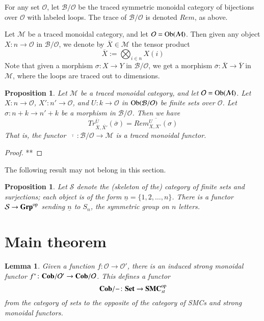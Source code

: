 \documentclass{amsart}
\def\tn{\textnormal}
\def\mc{\mathcal}
\def\Ob{\tn{Ob}}
\def\to{\rightarrow}
\def\taking{\colon}
\def\op{^\tn{op}}
\def\ol{\overline}
\def\ul{\underline}
\def\Cob{{\bf Cob}}
\def\Set{{\bf Set}}
\def\Grp{{\bf Grp}}
\def\mcB{\mc{B}}
\def\mcM{\mc{M}}
\def\mcO{\mc{O}}
\def\mcS{\mc{S}}
\def\SMC{{\bf SMC}}
\newtheorem{lemma}[subsubsection]{Lemma}
\newtheorem{proposition}[subsubsection]{Proposition}
\theoremstyle{remark}
\theoremstyle{definition}
\begin{document}
For any set $\mcO$, let $\mcB/\mcO$ be the traced symmetric monoidal category of bijections over $\mcO$ with labeled loops.  The trace of $\mcB/\mcO$ is denoted $Rem$, as above.

Let $\mcM$ be a traced monoidal category, and let $\mcO=\Ob(\mcM)$. Then given any object $X\taking n\to\mcO$ in $\mcB/\mcO$, we denote by $\ol{X}\in\mcM$ the tensor product 
$$\ol{X}:=\bigotimes_{i\in n}X(i)$$
Note that given a morphism $\sigma\taking X\to Y$ in $\mcB/\mcO$, we get a morphism $\ol{\sigma}\taking\ol{X}\to\ol{Y}$ in $\mcM$, where the loops are traced out to dimensions.

\begin{proposition}

Let $\mcM$ be a traced monoidal category, and let $\mcO=\Ob(\mcM)$. Let $X\taking n\to\mcO$, $X'\taking n'\to\mcO$, and $U\taking k\to\mcO$ in $\Ob(\mcB/\mcO)$ be finite sets over $\mcO$. Let $\sigma\taking n+k\to n'+k$ be a morphism in $\mcB/\mcO$. Then we have 
$$Tr^{\ol{U}}_{\ol{X},\ol{X'}}(\ol{\sigma})=\ol{Rem^U_{X,X'}(\sigma)}$$
That is, the functor $\ol{\;\cdot\;}\taking\mcB/\mcO\to\mcM$ is a traced monoidal functor.

\end{proposition}

\begin{proof}

**

\end{proof}

The following result may not belong in this section.

\begin{proposition}

Let $\mcS$ denote the (skeleton of the) category of finite sets and surjections; each object is of the form $\ul{n}=\{1,2,\ldots,n\}$. There is a functor $\mcS\to\Grp\op$ sending $\ul{n}$ to $S_n$, the symmetric group on $n$ letters.

\end{proposition}

\section{Main theorem}

\begin{lemma}

Given a function $f\taking\mcO\to\mcO'$, there is an induced strong monoidal functor $f^*\taking\Cob/\mcO'\to\Cob/\mcO$. This defines a functor 
$$\Cob/-\taking\Set\to\SMC_{st}\op$$
from the category of sets to the opposite of the category of SMCs and strong monoidal functors.

\end{lemma}
\end{document}

